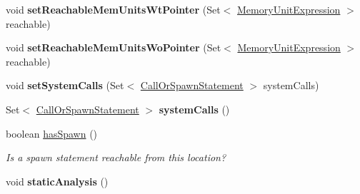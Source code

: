 \begin{DoxyCompactItemize}
\item 
\hypertarget{interfaceedu_1_1udel_1_1cis_1_1vsl_1_1civl_1_1model_1_1IF_1_1location_1_1Location_afcc531395d7090f3e1cf54b3b6088ffd}{}void {\bfseries set\+Reachable\+Mem\+Units\+Wt\+Pointer} (Set$<$ \hyperlink{interfaceedu_1_1udel_1_1cis_1_1vsl_1_1civl_1_1model_1_1IF_1_1expression_1_1MemoryUnitExpression}{Memory\+Unit\+Expression} $>$ reachable)\label{interfaceedu_1_1udel_1_1cis_1_1vsl_1_1civl_1_1model_1_1IF_1_1location_1_1Location_afcc531395d7090f3e1cf54b3b6088ffd}

\item 
\hypertarget{interfaceedu_1_1udel_1_1cis_1_1vsl_1_1civl_1_1model_1_1IF_1_1location_1_1Location_a706d3e25d3955d2f79d0b6fe849871a5}{}void {\bfseries set\+Reachable\+Mem\+Units\+Wo\+Pointer} (Set$<$ \hyperlink{interfaceedu_1_1udel_1_1cis_1_1vsl_1_1civl_1_1model_1_1IF_1_1expression_1_1MemoryUnitExpression}{Memory\+Unit\+Expression} $>$ reachable)\label{interfaceedu_1_1udel_1_1cis_1_1vsl_1_1civl_1_1model_1_1IF_1_1location_1_1Location_a706d3e25d3955d2f79d0b6fe849871a5}

\item 
\hypertarget{interfaceedu_1_1udel_1_1cis_1_1vsl_1_1civl_1_1model_1_1IF_1_1location_1_1Location_aba7a9771e10f947f43dc565da73afa68}{}void {\bfseries set\+System\+Calls} (Set$<$ \hyperlink{interfaceedu_1_1udel_1_1cis_1_1vsl_1_1civl_1_1model_1_1IF_1_1statement_1_1CallOrSpawnStatement}{Call\+Or\+Spawn\+Statement} $>$ system\+Calls)\label{interfaceedu_1_1udel_1_1cis_1_1vsl_1_1civl_1_1model_1_1IF_1_1location_1_1Location_aba7a9771e10f947f43dc565da73afa68}

\item 
\hypertarget{interfaceedu_1_1udel_1_1cis_1_1vsl_1_1civl_1_1model_1_1IF_1_1location_1_1Location_a0750d96efe8fc0ca5ba3bcd2758c0721}{}Set$<$ \hyperlink{interfaceedu_1_1udel_1_1cis_1_1vsl_1_1civl_1_1model_1_1IF_1_1statement_1_1CallOrSpawnStatement}{Call\+Or\+Spawn\+Statement} $>$ {\bfseries system\+Calls} ()\label{interfaceedu_1_1udel_1_1cis_1_1vsl_1_1civl_1_1model_1_1IF_1_1location_1_1Location_a0750d96efe8fc0ca5ba3bcd2758c0721}

\item 
boolean \hyperlink{interfaceedu_1_1udel_1_1cis_1_1vsl_1_1civl_1_1model_1_1IF_1_1location_1_1Location_a6fc4a6ece1b249d85cab5d9578e63775}{has\+Spawn} ()
\begin{DoxyCompactList}\small\item\em Is a spawn statement reachable from this location? \end{DoxyCompactList}\item 
\hypertarget{interfaceedu_1_1udel_1_1cis_1_1vsl_1_1civl_1_1model_1_1IF_1_1location_1_1Location_a203327a628ef85a0a8fd69a14014976d}{}void {\bfseries static\+Analysis} ()\label{interfaceedu_1_1udel_1_1cis_1_1vsl_1_1civl_1_1model_1_1IF_1_1location_1_1Location_a203327a628ef85a0a8fd69a14014976d}


\end{DoxyCompactItemize}
